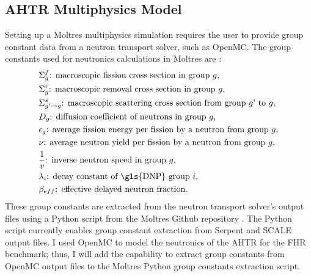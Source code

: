\subsection{AHTR Multiphysics Model}
\label{sec:ahtr_multiphysics_model}
Setting up a Moltres multiphysics simulation requires the user to provide group 
constant data from a neutron transport solver, such as OpenMC. 
The group constants used for neutronics calculations in Moltres are 
\cite{lindsay_introduction_2018,park_advancement_2020}: 
\begin{align*}
  &\Sigma^f_{g} \text{: macroscopic fission cross section in group $g$,} \\
  &\Sigma^r_{g} \text{: macroscopic removal cross section in group $g$,} \\
  &\Sigma^s_{g' \rightarrow g} \text{: macroscopic scattering cross section
  from group $g$' to $g$,} \\
  &D_g \text{: diffusion coefficient of neutrons in group $g$,} \\
  &\epsilon_g \text{: average fission energy per fission by a neutron from
  group $g$,} \\
  &\nu \text{: average neutron yield per fission by a neutron from group
  $g$,} \\
  &\frac{1}{v} \text{: inverse neutron speed in group $g$,} \\
  &\lambda_i \text{: decay constant of \gls{DNP} group $i$,} \\
  &\beta_{eff} \text{: effective delayed neutron fraction.} 
\end{align*}
These group constants are extracted from the neutron transport solver's output files 
using a Python script from the Moltres Github repository \cite{lindsay_moltres_2017}. 
The Python script currently enables group constant extraction from Serpent 
\cite{leppanen_serpent_2014} and SCALE \cite{bucholz_scale:_1982} output files.
I used OpenMC to model the neutronics of the \gls{AHTR} for the \gls{FHR} benchmark;
thus, I will add the capability to extract group constants from OpenMC output 
files to the Moltres Python group constants extraction script. 

